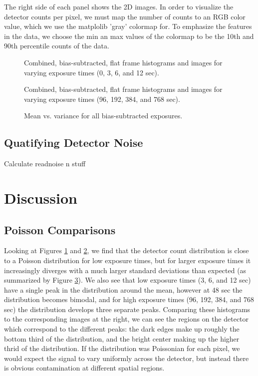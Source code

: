 \documentclass[preprint]{aastex62}
\begin{document}
The right side of each panel shows the 2D images. In order to visualize the detector counts per pixel, we must map the number of counts to an RGB color value, which we use the matplolib 'gray' colormap for. To emphasize the features in the data, we choose the min an max values of the colormap to be the 10th and 90th percentile counts of the data.


\begin{figure}[ht]
\caption{Combined, bias-subtracted, flat frame histograms and images for varying exposure times (0, 3, 6, and 12 sec). \label{fig:flats1}}
\end{figure}
\begin{figure}[ht]
\caption{Combined, bias-subtracted, flat frame histograms and images for varying exposure times (96, 192, 384, and 768 sec). \label{fig:flats2}}
\end{figure}

\begin{figure}[ht]
\caption{Mean vs. variance for all bias-subtracted exposures.} \label{fig:mean_var}
\end{figure}

\subsection{Quatifying Detector Noise}
Calculate readnoise n stuff

\section{Discussion}
\subsection{Poisson Comparisons}
Looking at Figures \ref{fig:flats1} and \ref{fig:flats2}, we find that the detector count distribution is close to a Poisson distribution for low exposure times, but for larger exposure times it increasingly diverges with a much larger standard deviations than expected (as summarized by Figure \ref{fig:mean_var}). We also see that low exposure times (3, 6, and 12 sec) have a single peak in the distribution around the mean, however at 48 sec the distribution becomes bimodal, and for high exposure times (96, 192, 384, and 768 sec) the distribution develops three separate peaks. Comparing these histograms to the corresponding images at the right, we can see the regions on the detector which correspond to the different peaks: the dark edges make up roughly the bottom third of the distribution, and the bright center making up the higher thrid of the distribution. If the distribution was Poissonian for each pixel, we would expect the signal to vary uniformly across the detector, but instead there is obvious contamination at different spatial regions.
\end{document}
